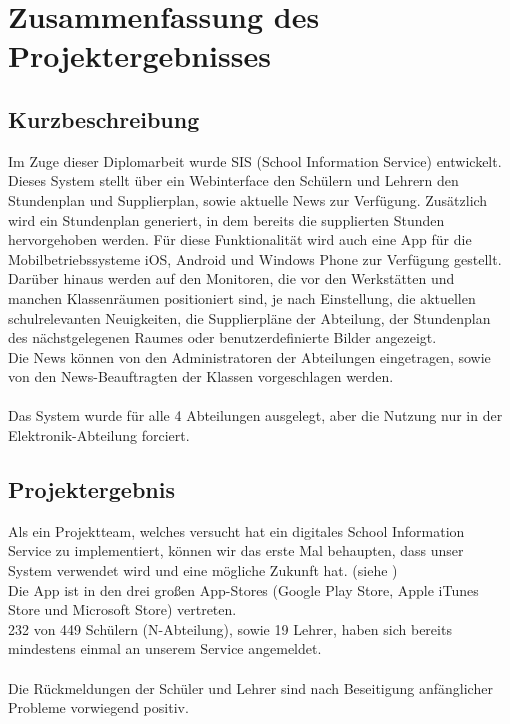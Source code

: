 \chapter[Zusammenfassung]{Zusammenfassung des Projektergebnisses}

\section{Kurzbeschreibung}
Im Zuge dieser Diplomarbeit wurde SIS (School Information Service) entwickelt. \\
Dieses System stellt über ein Webinterface den Schülern und Lehrern den Stundenplan und Supplierplan, sowie aktuelle News zur Verfügung. Zusätzlich wird ein Stundenplan generiert, in dem bereits die supplierten Stunden hervorgehoben werden.
Für diese Funktionalität wird auch eine App für die Mobilbetriebssysteme iOS, Android und Windows Phone zur Verfügung gestellt.\\
Darüber hinaus werden auf den Monitoren, die vor den Werkstätten und manchen Klassenräumen positioniert sind, je nach Einstellung, die aktuellen schulrelevanten Neuigkeiten, die Supplierpläne der Abteilung, der Stundenplan des nächstgelegenen Raumes oder benutzerdefinierte Bilder angezeigt.\\
Die News können von den Administratoren der Abteilungen eingetragen, sowie von den News-Beauftragten der Klassen vorgeschlagen werden.\\
\\
Das System wurde für alle 4 Abteilungen ausgelegt, aber die Nutzung nur in der Elektronik-Abteilung forciert.

\section{Projektergebnis}
Als ein Projektteam, welches versucht hat ein digitales School Information Service zu implementiert, können wir das erste Mal behaupten, dass unser System verwendet wird und eine mögliche Zukunft hat. (siehe )\\
Die App ist in den drei großen App-Stores (Google Play Store, Apple iTunes Store und Microsoft Store) vertreten.\\
232 von 449 Schülern (N-Abteilung), sowie 19 Lehrer, haben sich bereits mindestens einmal an unserem Service angemeldet. \\
\\
Die Rückmeldungen der Schüler und Lehrer sind nach Beseitigung anfänglicher Probleme vorwiegend positiv.


